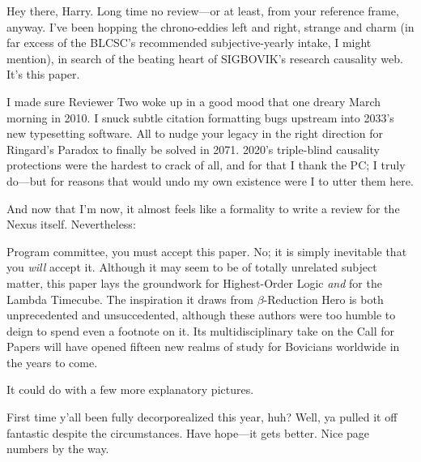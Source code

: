 \documentclass[12pt]{sigbovik-review}
\author{Dos Sleddins, Time Detective}
\begin{document}
\maketitle

Hey there, Harry. Long time no review---or at least, from your reference frame, anyway.
I've been hopping the chrono-eddies left and right, strange and charm
(in far excess of the BLCSC's recommended subjective-yearly intake, I might mention),
in search of the beating heart of SIGBOVIK's research causality web.
It's this paper.

I made sure Reviewer Two woke up in a good mood that one dreary March morning in 2010.
I snuck subtle citation formatting bugs upstream into 2033's new typesetting software.
All to nudge your legacy in the right direction
for Ringard's Paradox to finally be solved in 2071.
2020's triple-blind causality protections were the hardest to crack of all,
and for that I thank the PC; I truly do---but for reasons that would undo my own existence were I to utter them here.

And now that I'm now,
it almost feels like a formality to write a review for the Nexus itself.
Nevertheless:

Program committee, you must accept this paper.
No; it is simply inevitable that you {\it will} accept it.
Although it may seem to be of totally unrelated subject matter,
this paper lays the groundwork for
Highest-Order Logic
{\it and} for
the Lambda Timecube.
The inspiration it draws from $\beta$-Reduction Hero
is both unprecedented and unsuccedented,
although these authors were too humble to deign to spend even a footnote on it.
Its multidisciplinary take on the Call for Papers
will have opened fifteen new realms of study for Bovicians worldwide
in the years to come.

It could do with a few more explanatory pictures.

First time y'all been fully decorporealized this year, huh?
Well, ya pulled it off fantastic despite the circumstances.
Have hope---it gets better. Nice page numbers by the way.
\end{document}
